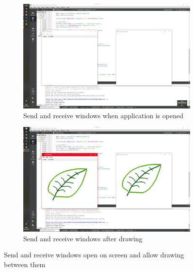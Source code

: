 \documentclass[10pt]{article}
\newcommand{\figsquish}{\vspace{-5mm}} %
\begin{document}
\begin{multicols*}{2}
\begin{figure}[H]
\begin{subfigure}[t]{0.48\columnwidth}
		\includegraphics[width=\columnwidth]{./application.png}
		\caption{Send and receive windows when application is opened}
		\label{fig:app}
	\end{subfigure}
	\hfill
	\begin{subfigure}[t]{0.48\columnwidth}

		\includegraphics[width=\columnwidth]{./application drawing.png}
		\caption{Send and receive windows after drawing}
		\label{fig:app-drawing}
	\end{subfigure}
	\caption{Send and receive windows open on screen and allow drawing between them}
	\label{fig:application}
\end{figure}
\figsquish

\begin{figure}[H]
	\centering
	\begin{subfigure}[t]{0.32\columnwidth}


\end{subfigure}
\end{figure}
\end{multicols*}
\end{document}
